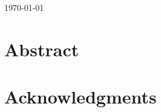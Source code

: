 \documentclass[11pt,a4paper]{article}
\begin{document}
\begin{titlepage}

{\large \today}\\[3cm] %

\vfill %

\end{titlepage}





\newpage




\section*{\center Abstract}

\clearpage
\section*{\center Acknowledgments}
\clearpage
\tableofcontents
\newpage
{}
\end{document}
